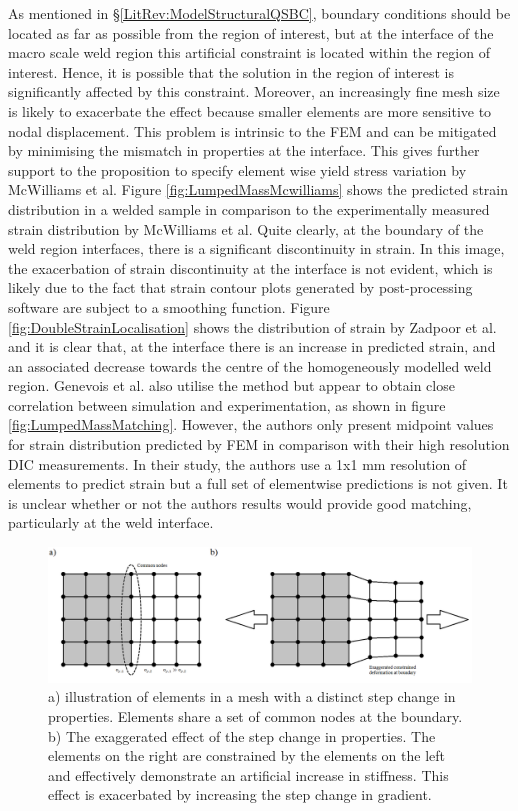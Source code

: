 As mentioned in \S\ref{LitRev:ModelStructuralQSBC}, boundary conditions should be located as far as possible from the region of interest, but at the interface of the macro scale weld region this artificial constraint is located within the region of interest. Hence, it is possible that the solution in the region of interest is significantly affected by this constraint. Moreover, an increasingly fine mesh size is likely to exacerbate the effect because smaller elements are more sensitive to nodal displacement. This problem is intrinsic to the FEM and can be mitigated by minimising the mismatch in properties at the interface. This gives further support to the proposition to specify element wise yield stress variation by McWilliams et al. Figure \ref{fig:LumpedMassMcwilliams} shows the predicted strain distribution in a welded sample in comparison to the experimentally measured strain distribution by McWilliams et al. \cite{McWilliams2013} Quite clearly, at the boundary of the weld region interfaces, there is a significant discontinuity in strain. In this image, the exacerbation of strain discontinuity at the interface is not evident, which is likely due to the fact that strain contour plots generated by post-processing software are subject to a smoothing function. Figure \ref{fig:DoubleStrainLocalisation} shows the distribution of strain by Zadpoor et al. \cite{Zadpoor2009} and it is clear that, at the interface there is an increase in predicted strain, and an associated decrease towards the centre of the homogeneously modelled weld region. Genevois et al. \cite{Genevois2006} also utilise the method but appear to obtain close correlation between simulation and experimentation, as shown in figure \ref{fig:LumpedMassMatching}. However, the authors only present midpoint values for strain distribution predicted by FEM in comparison with their high resolution DIC measurements. In their study, the authors use a 1x1 mm resolution of elements to predict strain but a full set of elementwise predictions is not given. It is unclear whether or not the authors results would provide good matching, particularly at the weld interface. 

\begin{figure}[h!]
	\centering
	\includegraphics[width=1\linewidth]{Figures/LiteratureReview/FEStepChange}
	\caption[Constrained mesh deformation]{a) illustration of elements in a mesh with a distinct step change in properties. Elements share a set of common nodes at the boundary. b) The exaggerated effect of the step change in properties. The elements on the right are constrained by the elements on the left and effectively demonstrate an artificial increase in stiffness. This effect is exacerbated by increasing the step change in gradient.}
	\label{fig:FEStepChange}
\end{figure}


